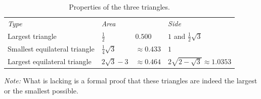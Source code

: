 \documentclass[onecolumn]{article}
\begin{document}
\begin{table}[h]
\caption{Properties of the three triangles.}
\label{table_triangles}
\center
\begin{tabular}{llll}
\emph{Type}                   & \emph{Area}             &                    & \emph{Side} \\
Largest triangle              & $\frac{1}{2}$           & $0.500$            & $1$ and $\frac{1}{2}\sqrt{3}$ \\
Smallest equilateral triangle & $\frac{1}{4} \sqrt{3}$  & $ \approx 0.433$   & $1$ \\
Largest equilateral triangle  & $2 \sqrt{3} - 3$        & $ \approx 0.464$   & $2 \sqrt{2-\sqrt{3}} \approx 1.0353$\\
\end{tabular}
\end{table}

\emph{Note:} What is lacking is a formal proof that these triangles are indeed the largest or the smallest possible.
\end{document}
